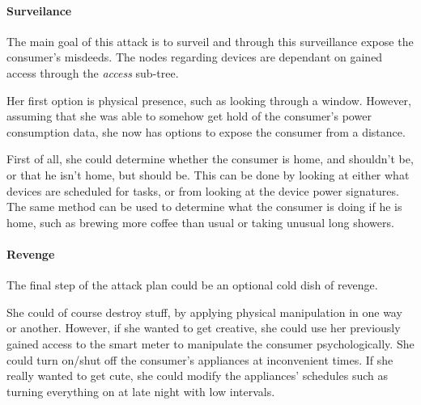 \paragraph{Surveilance}
The main goal of this attack is to surveil and through this surveillance expose the consumer's misdeeds.
The nodes regarding devices are dependant on gained access through the \textit{access} sub-tree.

Her first option is physical presence, such as looking through a window.
However, assuming that she was able to somehow get hold of the consumer's power consumption data, she now has options to expose the consumer from a distance.

First of all, she could determine whether the consumer is home, and shouldn't be, or that he isn't home, but should be.
This can be done by looking at either what devices are scheduled for tasks, or from looking at the device power signatures.
The same method can be used to determine what the consumer is doing if he is home, such as brewing more coffee than usual or taking unusual long showers.

\paragraph{Revenge}
The final step of the attack plan could be an optional cold dish of revenge.

She could of course destroy stuff, by applying physical manipulation in one way or another.
However, if she wanted to get creative, she could use her previously gained access to the smart meter to manipulate the consumer psychologically.
She could turn on/shut off the consumer's appliances at inconvenient times.
If she really wanted to get cute, she could modify the appliances' schedules such as turning everything on at late night with low intervals.